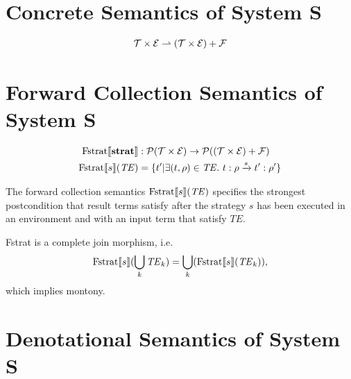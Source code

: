 \documentclass{article}
\begin{document}
{\section*{Concrete Semantics of System S}

\newcommand{\Domain}{\ensuremath \mathcal{D}}
\newcommand{\Terms}{\ensuremath \mathcal{T}}
\newcommand{\Fail}{\ensuremath \mathcal{F}}
\newcommand{\Env}{\ensuremath \mathcal{E}}
\newcommand{\Pow}[1]{\ensuremath \mathcal{P}(#1)}
\newcommand{\Fstrat}[1]{\ensuremath \text{Fstrat}\llbracket #1 \rrbracket}

\begin{align*}
  \Terms \times \Env \rightharpoonup (\Terms \times \Env) + \Fail
\end{align*}

\section*{Forward Collection Semantics of System S}

\begin{align*}
  \Fstrat{\mathbf{strat}} &: \Pow{\Terms \times \Env} \rightarrow \Pow{(\Terms \times \Env) + \Fail} \\
  \Fstrat{s}(\mathit{TE}) &= \lbrace t' | \exists (t,\rho) \in \mathit{TE}.\ \termrule{t:\rho}{s}{t':\rho'} \rbrace
\end{align*}

The forward collection semantics $\Fstrat{s}(\mathit{TE})$ specifies the strongest postcondition that result terms satisfy after the strategy $s$ has been executed in an environment and with an input term that satisfy $\mathit{TE}$. 

\noindent
Fstrat is a complete join morphism, i.e.
%
\begin{align*}
  \Fstrat{s}(\bigcup_k \mathit{TE}_k) = \bigcup_k(\Fstrat{s}(\mathit{TE}_k)),
\end{align*}
%
which implies montony.

\section*{Denotational Semantics of System S}

\newcommand{\lift}[2]{\ensuremath \text{lift}_{#1}(#2)}
\newcommand{\meet}{\ensuremath \sqcap}
\newcommand{\join}{\ensuremath \sqcup}
\newcommand{\eval}[3]{\ensuremath \mathbb{E} \llbracket #1 \rrbracket (#2,#3)}
\newcommand{\var}{\ensuremath \mathcal{V}ar}
\newcommand{\unfold}[3]{\ensuremath \text{unfold}(#1,#2,#3)}
\newcommand{\Fix}[2]{\ensuremath \text{fix}(#1,#2)}

}
\end{document}
